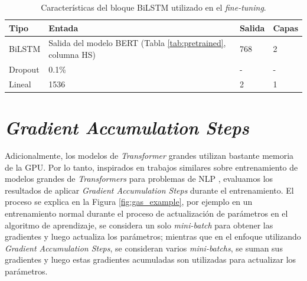 \begin{table}[t]%
	\centering
	\caption{Características del bloque BiLSTM utilizado en el \textit{fine-tuning}.}
	\label{tab:biLSTM}%
	\setlength{\tabcolsep}{0.5em} %
	{\renewcommand{\arraystretch}{1.5}%
		\begin{tabular}{lp{9cm}p{1cm}p{1cm}}
			\textbf{Tipo}   & \textbf{Entada} & \textbf{Salida}& \textbf{Capas} \\ \hline
			
			BiLSTM & Salida del modelo BERT (Tabla \ref{tab:pretrained}, columna HS) & 768 & 2 \\ %
			
			Dropout & 0.1\% & - & - \\
			Lineal & 1536 & 2 & 1 \\ %
	\end{tabular}}
	
\end{table}





\section{\textit{Gradient Accumulation Steps}}\label{sec:gas}

Adicionalmente, los modelos de \textit{Transformer} grandes utilizan bastante memoria de la GPU. Por lo tanto, inspirados en trabajos similares sobre entrenamiento de modelos grandes de \textit{Transformers} para problemas de NLP \citep{anil2021large,zhang2023adam,huang2023measuring}, evaluamos los resultados de aplicar \textit{Gradient Accumulation Steps} durante el entrenamiento. El proceso se explica en la Figura \ref{fig:gas_example}, por ejemplo en un entrenamiento normal durante el proceso de actualización de parámetros en el algoritmo de aprendizaje, se considera un solo \textit{mini-batch} para obtener las gradientes y luego actualiza los parámetros; mientras que en el enfoque utilizando \textit{Gradient Accumulation Steps}, se consideran varios \textit{mini-batchs}, se suman sus gradientes y luego estas gradientes acumuladas son utilizadas para actualizar los parámetros.



